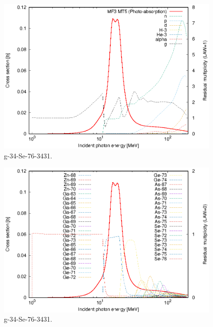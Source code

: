 \begin{figure}
 \includegraphics[width=\linewidth]{eps/g_34-Se-76_3431.eps}
  \caption{g-34-Se-76-3431.}
\end{figure}
\begin{figure}
 \includegraphics[width=\linewidth]{eps-law0/g_34-Se-76_3431.eps}
 \caption{g-34-Se-76-3431.}
\end{figure}
\newpage \clearpage

